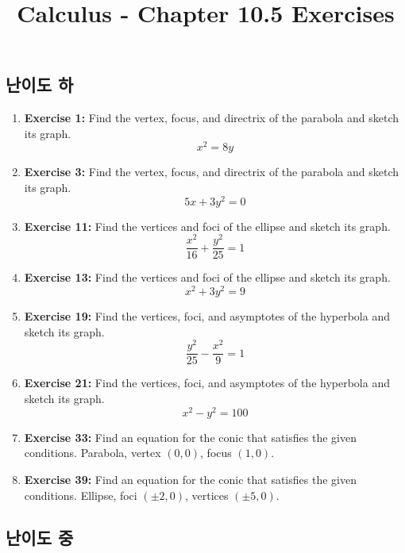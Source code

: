 \documentclass[12pt, a4paper]{article}
\title{Calculus - Chapter 10.5 Exercises}
\author{}
\date{}
\begin{document}
\maketitle
\hrulefill
\vspace{1em}

\subsection*{난이도 하}

\begin{enumerate}
    \item \textbf{Exercise 1:} Find the vertex, focus, and directrix of the parabola and sketch its graph.
    \[ x^2 = 8y \]

    \item \textbf{Exercise 3:} Find the vertex, focus, and directrix of the parabola and sketch its graph.
    \[ 5x + 3y^2 = 0 \]

    \item \textbf{Exercise 11:} Find the vertices and foci of the ellipse and sketch its graph.
    \[ \frac{x^2}{16} + \frac{y^2}{25} = 1 \]

    \item \textbf{Exercise 13:} Find the vertices and foci of the ellipse and sketch its graph.
    \[ x^2 + 3y^2 = 9 \]

    \item \textbf{Exercise 19:} Find the vertices, foci, and asymptotes of the hyperbola and sketch its graph.
    \[ \frac{y^2}{25} - \frac{x^2}{9} = 1 \]

    \item \textbf{Exercise 21:} Find the vertices, foci, and asymptotes of the hyperbola and sketch its graph.
    \[ x^2 - y^2 = 100 \]

    \item \textbf{Exercise 33:} Find an equation for the conic that satisfies the given conditions. Parabola, vertex $(0, 0)$, focus $(1, 0)$.

    \item \textbf{Exercise 39:} Find an equation for the conic that satisfies the given conditions. Ellipse, foci $(\pm 2, 0)$, vertices $(\pm 5, 0)$.
\end{enumerate}

\hrulefill
\vspace{1em}

\subsection*{난이도 중}
\end{document}
